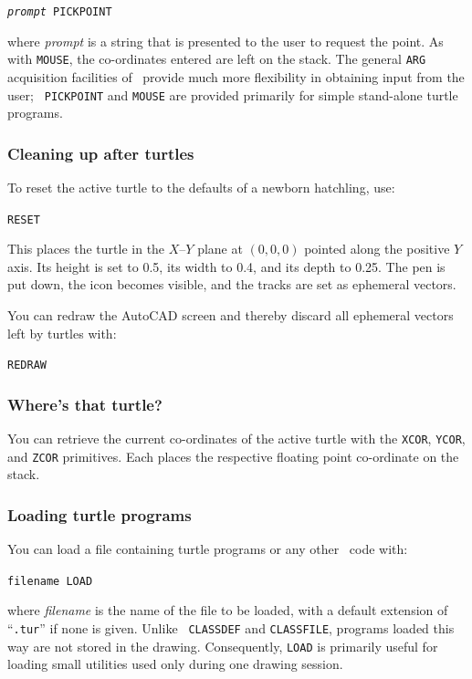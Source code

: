 \documentclass{article}
\begin{document}
{\tt {\em prompt} PICKPOINT}

where {\em prompt} is a string that is presented to the user to request
the point.  As with {\tt MOUSE}, the co-ordinates entered are left on
the stack.  The general {\tt ARG} acquisition facilities of \cw\
provide much more flexibility in obtaining input from the user; {\tt
PICKPOINT} and {\tt MOUSE} are provided primarily for simple
stand-alone turtle programs.

\subsubsection{Cleaning up after turtles}

To reset the active turtle to the defaults of a newborn hatchling, use:

{\tt RESET}

This places the turtle in the $X$--$Y$ plane at $(0,0,0)$ pointed
along the positive $Y$ axis.  Its height is set to 0.5, its width to
0.4, and its depth to 0.25.  The pen is put down, the icon becomes
visible, and the tracks are set as ephemeral vectors.

You can redraw the AutoCAD screen and thereby discard all ephemeral
vectors left by turtles with:

{\tt REDRAW}

\subsubsection{Where's that turtle?}

You can retrieve the current co-ordinates of the active turtle with
the {\tt XCOR}, {\tt YCOR}, and {\tt ZCOR} primitives.  Each places
the respective floating point co-ordinate on the stack.

\subsubsection{Loading turtle programs}

You can load a file containing turtle programs or any other \atlas\
code with:

{\tt filename LOAD}

where {\em filename} is the name of the file to be loaded, with a
default extension of ``{\tt .tur}'' if none is given.  Unlike {\tt
CLASSDEF} and {\tt CLASSFILE}, programs loaded this way are not stored
in the drawing.
Consequently, {\tt LOAD} is primarily useful for loading small
utilities used only during one drawing session.
\end{document}
